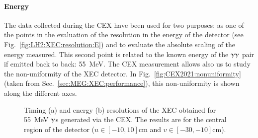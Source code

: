 \begin{refsection}
        \paragraph{Energy} The data collected during the CEX have been used for two purposes: as one of the points in the evaluation of the resolution in the energy of the detector (see Fig.~\ref{fig:LH2:XEC:resolution:E}) and to evaluate the absolute scaling of the energy measured.
        This second point is related to the known energy of the $\upgamma\upgamma$ pair if emitted back to back: \SI{55}{MeV}.
        The CEX measurement allows also us to study the non-uniformity of the XEC detector.
        In Fig.~\ref{fig:CEX2021:nonuniformity} (taken from Sec.~\ref{sec:MEG:XEC:performance}), this non-uniformity is shown along the different axes.
        
        \begin{figure}[]   
            \centering
            \hfill
            \caption[CEX 2021: Time and energy resolutions]{Timing (a) and energy (b) resolutions of the XEC obtained for \SI{55}{MeV} $\upgamma$s generated via the CEX. The results are for the central region of the detector ($u\in[-10,10]$cm and $v\in[-30,-10]$cm).}
            \label{fig:LH2:XEC:resolution}
        \end{figure}


\end{refsection}

